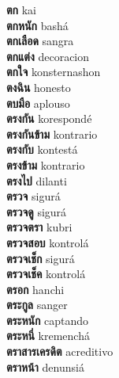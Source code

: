 \textbf{ ตก  } kai \\
\textbf{ ตกหนัก  } bashá \\
\textbf{ ตกเลือด  } sangra \\
\textbf{ ตกแต่ง  } decoracion \\
\textbf{ ตกใจ  } konsternashon \\
\textbf{ ตงฉิน  } honesto \\
\textbf{ ตบมือ  } aplouso \\
\textbf{ ตรงกัน  } korespondé \\
\textbf{ ตรงกันข้าม  } kontrario \\
\textbf{ ตรงกับ  } kontestá \\
\textbf{ ตรงข้าม  } kontrario \\
\textbf{ ตรงไป  } dilanti \\
\textbf{ ตรวจ  } sigurá \\
\textbf{ ตรวจดู  } sigurá \\
\textbf{ ตรวจตรา  } kubri \\
\textbf{ ตรวจสอบ  } kontrolá \\
\textbf{ ตรวจเช็ก  } sigurá \\
\textbf{ ตรวจเช็ค  } kontrolá \\
\textbf{ ตรอก  } hanchi \\
\textbf{ ตระกูล  } sanger \\
\textbf{ ตระหนัก  } captando \\
\textbf{ ตระหนี่  } kremenchá \\
\textbf{ ตราสารเครดิต  } acreditivo \\
\textbf{ ตราหน้า  } denunsiá \\
